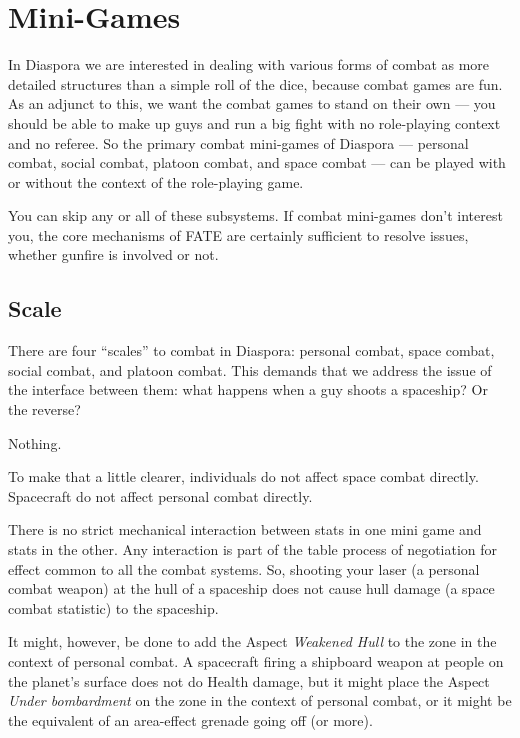 \section{Mini-Games}\label{sec:mini-games} %

In Diaspora we are interested in dealing with various forms of combat as more detailed structures than a simple roll of the dice, because combat games are fun. As an adjunct to this, we want the combat games to stand on their own --- you should be able to make up guys and run a big fight with no role-playing context and no referee.  So the primary combat mini-games of Diaspora --- personal combat, social combat, platoon combat, and space combat --- can be played with or without the context of the role-playing game.

You can skip any or all of these subsystems. If combat mini-games don't interest you, the core mechanisms of FATE are certainly sufficient to resolve issues, whether gunfire is involved or not.

\subsection{Scale}\label{sec:Scale} %

There are four ``scales'' to combat in Diaspora: personal combat, space combat, social combat, and platoon combat. This demands that we address the issue of the interface between them: what happens when a guy shoots a spaceship? Or the reverse?

Nothing.

To make that a little clearer, individuals do not affect space combat directly. Spacecraft do not affect personal combat directly.

There is no strict mechanical interaction between stats in one mini game and stats in the other. Any interaction is part of the table process of negotiation for effect common to all the combat systems. So, shooting your laser (a personal combat weapon) at the hull of a spaceship does not cause hull damage (a space combat statistic) to the spaceship.

It might, however, be done to add the Aspect \emph{Weakened Hull} to the zone in the context of personal combat. A spacecraft firing a shipboard weapon at people on the planet's surface does not do Health damage, but it might place the Aspect \emph{Under bombardment} on the zone in the context of personal combat, or it might be the equivalent of an area-effect grenade going off (or more).


